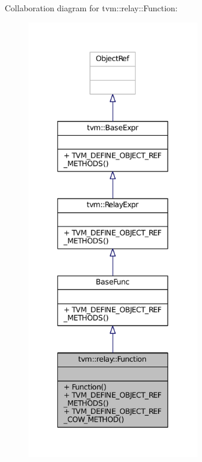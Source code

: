 Collaboration diagram for tvm\+:\+:relay\+:\+:Function\+:
\nopagebreak
\begin{figure}[H]
\begin{center}
\leavevmode
\includegraphics[height=550pt]{classtvm_1_1relay_1_1Function__coll__graph}
\end{center}
\end{figure}
